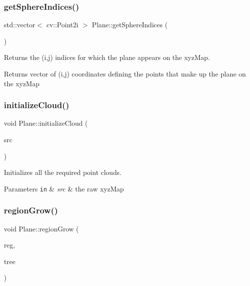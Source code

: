\subsubsection{\texorpdfstring{get\+Sphere\+Indices()}{getSphereIndices()}}
{\footnotesize\ttfamily std\+::vector$<$ cv\+::\+Point2i $>$ Plane\+::get\+Sphere\+Indices (\begin{DoxyParamCaption}{ }\end{DoxyParamCaption})}



Returns the (i,j) indices for which the plane appears on the xyz\+Map. 

\begin{DoxyReturn}{Returns}
vector of (i,j) coordinates defining the points that make up the plane on the xyz\+Map 
\end{DoxyReturn}
\hypertarget{class_plane_ab884c9687d63290912707f749adad115}{}\label{class_plane_ab884c9687d63290912707f749adad115} 
\subsubsection{\texorpdfstring{initialize\+Cloud()}{initializeCloud()}}
{\footnotesize\ttfamily void Plane\+::initialize\+Cloud (\begin{DoxyParamCaption}\item[{cv\+::\+Mat \&}]{src }\end{DoxyParamCaption})}



Initializes all the required point clouds. 


\begin{DoxyParams}[1]{Parameters}
\mbox{\tt in}  & {\em src} & the raw xyz\+Map \\
\hline
\end{DoxyParams}
\hypertarget{class_plane_a08b35c23d8e0f3eea0db820163cda6e0}{}\label{class_plane_a08b35c23d8e0f3eea0db820163cda6e0} 
\subsubsection{\texorpdfstring{region\+Grow()}{regionGrow()}}
{\footnotesize\ttfamily void Plane\+::region\+Grow (\begin{DoxyParamCaption}\item[{pcl\+::\+Region\+Growing$<$ pcl\+::\+Point\+X\+YZ, pcl\+::\+Normal $>$ \&}]{reg,  }\item[{pcl\+::search\+::\+Search$<$ pcl\+::\+Point\+X\+YZ $>$\+::Ptr}]{tree }\end{DoxyParamCaption})\hspace{0.3cm}{\ttfamily [private]}}



